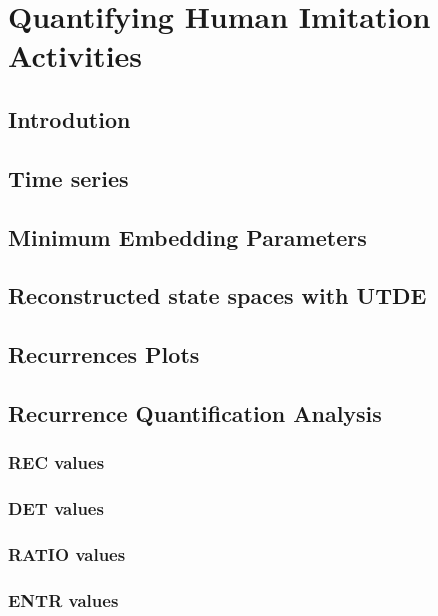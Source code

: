 
\chapter{Quantifying Human Imitation Activities} \label{chapter5}

%
%




\section{Introdution}

\section{Time series}

\section{Minimum Embedding Parameters}

\section{Reconstructed state spaces with UTDE}

\section{Recurrences Plots}

\section{Recurrence Quantification Analysis}


\subsection{REC values}

\subsection{DET values}

\subsection{RATIO values}

\subsection{ENTR values}
